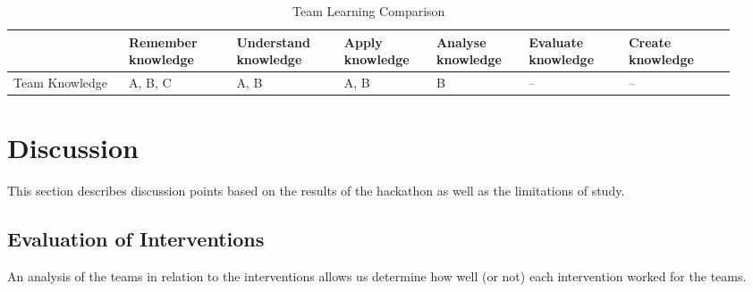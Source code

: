 \documentclass[runningheads]{llncs}
\begin{document}
\begin{table}[h]
    \caption{Team Learning Comparison}
    \label{tab:bloomteamcomp}
    \centering
    \begin{tabular}{|p{0.15\linewidth}|p{0.14\linewidth}|p{0.14\linewidth}|p{0.12\linewidth}|p{0.12\linewidth}|p{0.13\linewidth}|p{0.14\linewidth}|}
    \hline
	 & Remember knowledge & Understand knowledge & Apply knowledge & Analyse knowledge & Evaluate knowledge & Create knowledge\\ \hline
	Team \newline Knowledge & A, B, C & A, B & A, B & B & -- & -- \\ \hline
    \end{tabular}
\end{table}


\section{Discussion}
This section describes discussion points based on the results of the hackathon as well as the limitations of study.

\subsection{Evaluation of Interventions} \label{evalintervention}
An analysis of the teams in relation to the interventions allows us determine how well (or not) each intervention worked for the teams. %
\end{document}
